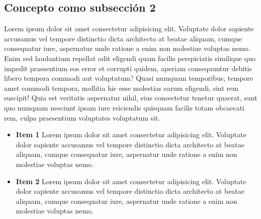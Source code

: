 \begin{sectext}
        \subsection{Concepto como subsección 2}
            \begin{subsectext}
                Lorem ipsum dolor sit amet consectetur adipisicing elit. Voluptate dolor sapiente accusamus vel tempore distinctio dicta architecto at beatae aliquam, cumque consequatur iure, aspernatur unde ratione a enim non molestiae voluptas nemo. Enim sed laudantium repellat odit eligendi quam facilis perspiciatis similique quo impedit praesentium eos error et corrupti quidem, aperiam consequuntur debitis libero tempora commodi aut voluptatum? Quasi numquam temporibus, tempore amet commodi tempora, mollitia hic esse molestias earum eligendi, sint rem suscipit! Quia est veritatis aspernatur nihil, eius consectetur tenetur quaerat, sunt quo numquam nesciunt ipsam iure reiciendis quisquam facilis totam obcaecati rem, culpa praesentium voluptates voluptatum sit. 

                \begin{itemize}
                    \item \textbf{Item 1}\newline
                    Lorem ipsum dolor sit amet consectetur adipisicing elit. Voluptate dolor sapiente accusamus vel tempore distinctio dicta architecto at beatae aliquam, cumque consequatur iure, aspernatur unde ratione a enim non molestiae voluptas nemo. 

                    \item \textbf{Item 2}\newline
                    Lorem ipsum dolor sit amet consectetur adipisicing elit. Voluptate dolor sapiente accusamus vel tempore distinctio dicta architecto at beatae aliquam, cumque consequatur iure, aspernatur unde ratione a enim non molestiae voluptas nemo.
                \end{itemize}

            \end{subsectext}
    \end{sectext}

